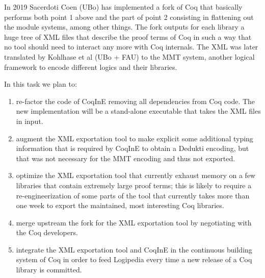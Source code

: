In 2019 Sacerdoti Coen (UBo) has implemented a fork of Coq that basically performs both point 1 above and the part of point 2 consisting in flattening out the module systems, among other things. The fork outputs for each library a huge tree of XML files that describe the proof terms of Coq in such a way that no tool should need to interact any more with Coq internals. The XML was later translated by Kohlhase et al (UBo + FAU) to the MMT system, another logical framework to encode different logics and their libraries.

In this task we plan to:
\begin{enumerate}
 \item re-factor the code of CoqInE removing all dependencies from Coq code. The new implementation will be a stand-alone executable that takes the XML files in input.
 \item augment the XML exportation tool to make explicit some additional typing information that is required by CoqInE to obtain a Dedukti encoding, but that was not necessary for the MMT encoding and thus not exported.
 \item optimize the XML exportation tool that currently exhaust memory on a few libraries that contain extremely large proof terms; this is likely to require a re-engineerization of some parts of the tool that currently takes more than one week to export the maintained, most interesting Coq libraries.
 \item merge upstream the fork for the XML exportation tool by negotiating with the Coq developers.
 \item integrate the XML exportation tool and CoqInE in the continuous building system of Coq in order to feed Logipedia every time a new release of a Coq library is committed.
\end{enumerate}

